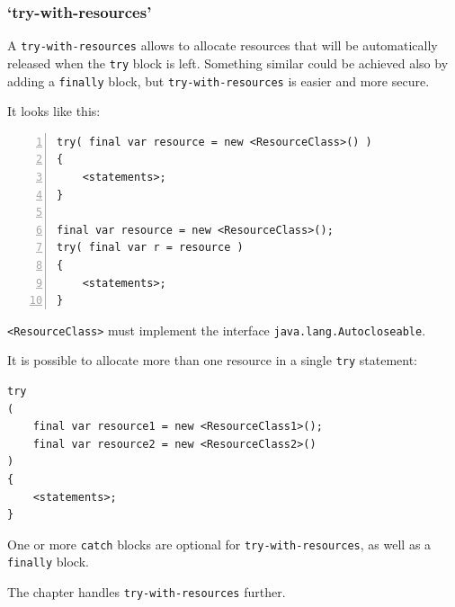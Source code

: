 \subsubsection{‘try-with-resources’}
A \verb#try-with-resources# allows to allocate resources that will be automatically released when the \lstinline|try| block is left. Something similar could be achieved also by adding a \lstinline|finally| block, but \verb#try-with-resources# is easier and more secure.

It looks like this:
\begin{lstlisting}[numbers=left]
try( final var resource = new <ResourceClass>() )
{
    <statements>;
}

final var resource = new <ResourceClass>();
try( final var r = resource )
{
    <statements>;
}
\end{lstlisting}

\lstinline|<ResourceClass>| must implement the interface \lstinline|java.lang.Autocloseable|\autocite{ORACLE_DOC_AUTOCLOSEABLE_INTERFACE}.

It is possible to allocate more than one resource in a single \lstinline|try| statement:
\begin{lstlisting}
try
( 
    final var resource1 = new <ResourceClass1>(); 
    final var resource2 = new <ResourceClass2>() 
)
{
    <statements>;
}
\end{lstlisting}

One or more \lstinline|catch| blocks are optional for \verb#try-with-resources#, as well as a \lstinline|finally| block.

The chapter  handles \verb#try-with-resources# further.







